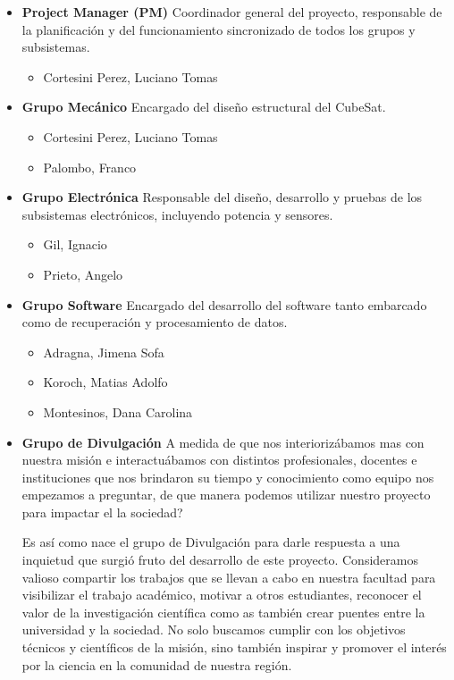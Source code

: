      \begin{itemize}
        \item \textbf{Project Manager (PM)}
          Coordinador general del proyecto, responsable de la planificación y del funcionamiento
          sincronizado de todos los grupos y subsistemas.
          \begin{itemize}
            \item Cortesini Perez, Luciano Tomas
          \end{itemize}
        \item \textbf{Grupo Mecánico}
         Encargado del diseño estructural del CubeSat.
          \begin{itemize}
            \item Cortesini Perez, Luciano Tomas
            \item Palombo, Franco
          \end{itemize}
        \item \textbf{Grupo Electrónica}
          Responsable del diseño, desarrollo y pruebas de los subsistemas electrónicos, incluyendo
          potencia y sensores.
          \begin{itemize}
            \item Gil, Ignacio
            \item Prieto, Angelo
          \end{itemize}
          \item \textbf{Grupo Software}
          Encargado del desarrollo del software tanto embarcado como de recuperación y procesamiento de datos.
          \begin{itemize}
            \item Adragna, Jimena Sofa
            \item Koroch, Matias Adolfo
            \item Montesinos, Dana Carolina
          \end{itemize}
        \item \textbf{Grupo de Divulgación}
          A medida de que nos interiorizábamos mas con nuestra misión e interactuábamos con
          distintos profesionales, docentes e instituciones que nos brindaron su tiempo y conocimiento
          como equipo nos empezamos a preguntar, de que manera podemos utilizar
          nuestro proyecto para impactar el la sociedad?

          Es así como nace el grupo de Divulgación para darle respuesta a una inquietud que
          surgió fruto del desarrollo de este proyecto. Consideramos valioso compartir los trabajos
          que se llevan a cabo en nuestra facultad para visibilizar el trabajo académico, motivar
          a otros estudiantes, reconocer el valor de la investigación científica como as también
          crear puentes entre la universidad y la sociedad. No solo buscamos cumplir con los
          objetivos técnicos y científicos de la misión, sino también inspirar y promover el interés
          por la ciencia en la comunidad de nuestra región.


\end{itemize}
